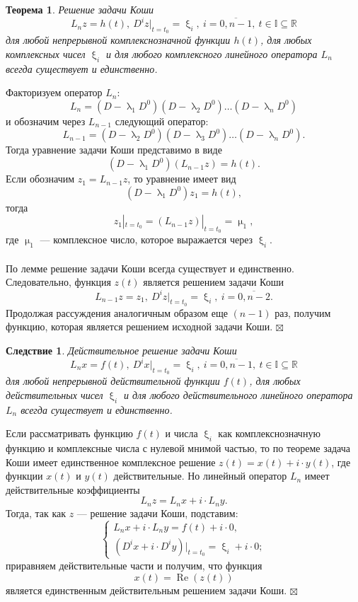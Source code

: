 \documentclass[a4paper, 12pt]{report}
\newenvironment{Proof} %
{\par\noindent{$\blacklozenge$}} %
{\hfill$\scriptstyle\boxtimes$}
\renewcommand{\lambda}{\uplambda}
\renewcommand{\mu}{\upmu}
\renewcommand{\xi}{\upxi}
\renewcommand{\Re}{\operatorname{Re}}
\begin{document}
	\newtheorem*{2_1_2}{Теорема}\begin{2_1_2} Решение задачи Коши $$L_nz = h(t),\ D^iz|_{t=t_0} = \xi_i,\ i=\overline{0,n-1},\ t\in\mathbb{I}\subseteq\mathbb{R}$$ для любой непрерывной комплекснозначной функции $h(t)$, для любых комплексных чисел $\xi_i$ и для любого комплексного линейного оператора $L_n$ всегда существует и единственно.
	\end{2_1_2}\begin{Proof}
		Факторизуем оператор $L_n$: $$L_n = (D-\lambda_1D^0)(D-\lambda_2D^0)\ldots(D-\lambda_nD^0)$$ и обозначим через $L_{n-1}$ следующий оператор: $$L_{n-1} = (D-\lambda_2D^0)(D-\lambda_3D^0)\ldots(D-\lambda_nD^0).$$ Тогда уравнение задачи Коши представимо в виде $$(D-\lambda_1D^0)(L_{n-1}z) = h(t).$$
		Если обозначим $z_1=L_{n-1}z$, то уравнение имеет вид $$(D - \lambda_1D^0)z_1 = h(t),$$ тогда $$z_1|_{t=t_0}=(L_{n-1}z)|_{t=t_0} = \mu_1,$$ где $\mu_1$ --- комплексное число, которое выражается через $\xi_i$.\\\\
		По лемме решение задачи Коши всегда существует и единственно. Следовательно, функция $z(t)$ является решением задачи Коши $$L_{n-1}z = z_1,\ D^iz|_{t=t_0} = \xi_i,\ i=\overline{0,n-2}.$$ Продолжая рассуждения аналогичным образом еще $(n-1)$ раз, получим функцию, которая является решением исходной задачи Коши.
	\end{Proof}
	\newtheorem*{2_1_3}{Следствие}\begin{2_1_3} Действительное решение задачи Коши $$L_nx = f(t),\ D^ix|_{t=t_0} = \xi_i,\ i=\overline{0,n-1}, \ t\in\mathbb{I}\subseteq\mathbb{R}$$ для любой непрерывной действительной функции $f(t)$, для любых действительных чисел $\xi_i$ и для любого действительного линейного оператора $L_n$ всегда существует и единственно.
	\end{2_1_3}\begin{Proof}
		Если рассматривать функцию $f(t)$ и числа $\xi_i$ как комплекснозначную функцию и комплексные числа с нулевой мнимой частью, то по теореме задача Коши имеет единственное комплексное решение $z(t) = x(t) + i\cdot y(t)$, где функции $x(t)$ и $y(t)$ действительные. Но линейный оператор $L_n$ имеет действительные коэффициенты $$L_nz = L_nx + i\cdot L_ny.$$
		Тогда, так как $z$ --- решение задачи Коши, подставим: $$\begin{cases}
			L_nx + i\cdot L_ny = f(t) + i\cdot 0,\\
			(D^ix + i\cdot D^iy)|_{t=t_0} = \xi_i + i\cdot 0;
		\end{cases}$$ приравняем действительные части и получим, что функция $$x(t) = \Re(z(t))$$ является единственным действительным решением задачи Коши.
	\end{Proof}
\end{document}
